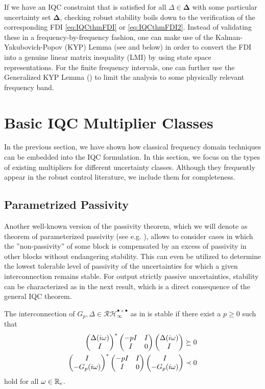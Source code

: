 If we have an IQC constraint that is satisfied for all $\Delta\in\bm{\Delta}$ with some particular uncertainty 
set $\bm{\Delta}$, checking robust stability boils down to the verification of the corresponding FDI \eqref{eq:IQCthmFDI} 
or \eqref{eq:IQCthmFDI2}. Instead of validating these in a frequency-by-frequency fashion, one can make use of 
the Kalman-Yakubovich-Popov (KYP) Lemma (see \cite{rantzerkyp} and below) in order to convert the FDI into 
a genuine linear matrix inequality (LMI) by using state space representations. For the finite frequency intervals, 
one can further use the Generalized KYP Lemma (\cite{genelKYP}) to limit the analysis to some physically relevant frequency band.

\section{Basic IQC Multiplier Classes}
In the previous section, we have shown how classical frequency domain techniques can be embedded into the IQC formulation. In this section, we focus on the types of existing multipliers for different uncertainty classes. Although they frequently appear in the robust control literature, we include them for completeness.


\subsection{Parametrized Passivity}\label{sec:osppass}
Another well-known version of the passivity theorem, {which we will denote as} theorem of parameterized passivity (see e.g. \cite[Thm. VI.5.10]{desvid}), allows to consider cases in which the ''non-passivity'' of some block is compensated by an excess of passivity in other blocks without endangering stability. This can even be utilized to determine the lowest tolerable level of passivity of the uncertainties for which a given interconnection remains stable. For output strictly passive uncertainties, stability can be characterized as in the next result, which is a direct consequence of the general IQC theorem.

\begin{coroll}\label{thm:desvidpass} {The interconnection of $G_p,\Delta\in \mathcal{RH}^{\bullet \times \bullet}_\infty$ as in  is stable}
if there exist a ${p\geq 0}$ such that
\begin{align}
\begin{pmatrix}\Delta(i\omega)\\I\end{pmatrix}^*\begin{pmatrix}-pI &I\\I &0\end{pmatrix}\begin{pmatrix}\Delta(i\omega)\\ I\end{pmatrix} &\succeq 0 \label{eq:parampas1}\\
\begin{pmatrix}I\\ -G_p(i\omega)\end{pmatrix}^*\begin{pmatrix}-pI &I\\I &0\end{pmatrix}\begin{pmatrix}I\\ -G_p(i\omega)\end{pmatrix} &\prec 0 \label{eq:parampas2}
\end{align} hold for all $\omega\in\mathbb{R}_e$.
\end{coroll}

